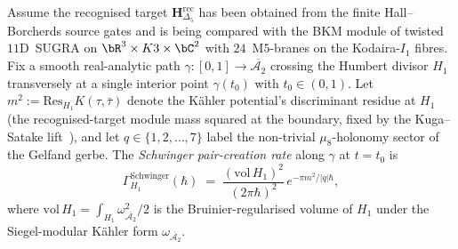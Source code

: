 \begin{definition}
\label{def:htbb-schwinger-pair}
Assume the recognised target
$\mathbf{H}_{\Delta_5}^{\mathrm{rec}}$ has been obtained from the
finite Hall--Borcherds source gates and is being compared with the BKM
module of twisted $11$D~SUGRA on $\bR^3\times K3\times\bC^2$ with
$24$~M$5$-branes on the Kodaira-$I_1$ fibres. Fix a smooth
real-analytic path
$\gamma\colon [0, 1]\to\overline{\mathcal{A}_2}$ crossing the Humbert
divisor $H_1$ transversely at a single interior point $\gamma(t_0)$
with $t_0\in(0, 1)$. Let $m^2 := \mathrm{Res}_{H_1}K(\tau, \bar\tau)$
denote the K\"ahler potential's discriminant residue at $H_1$
(the recognised-target module mass squared at the boundary, fixed by
the Kuga--Satake lift~\cite[\S 6]{KugaSatake1967}), and let
$q\in\{1, 2, \ldots, 7\}$ label the non-trivial $\mu_8$-holonomy
sector of the Gelfand gerbe. The \emph{Schwinger pair-creation rate}
along $\gamma$ at $t = t_0$ is
\begin{equation}\label{eq:htbb-schwinger-rate}
 \Gamma^{\mathrm{Schwinger}}_{H_1}(\hbar)
 \;=\; \frac{(\mathrm{vol}\,H_1)^2}{(2\pi\hbar)^2}\,
 e^{-\pi m^2/|q|\hbar},
\end{equation}
where $\mathrm{vol}\,H_1 = \int_{H_1}\omega^2_{\overline{\mathcal{A}_2}}/2$
is the Bruinier-regularised volume of $H_1$ under the Siegel-modular
K\"ahler form $\omega_{\overline{\mathcal{A}_2}}$.
\end{definition}

